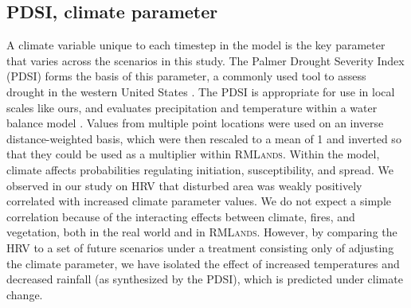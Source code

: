 \documentclass[12pt]{article}
\begin{document}
\begin{spacing}{1}

\subsection*{PDSI, climate parameter}
A climate variable unique to each timestep in the model is the key parameter that varies across the scenarios in this study. The Palmer Drought Severity Index (PDSI) forms the basis of this parameter, a commonly used tool to assess drought in the western United States \citep{Cook2004}. The PDSI is appropriate for use in local scales like ours, and evaluates precipitation and temperature within a water balance model \citep{HeimJr2002}. Values from multiple point locations were used on an inverse distance-weighted basis, which were then rescaled to a mean of 1 and inverted so that they could be used as a multiplier within \textsc{RMLands}. Within the model, climate affects probabilities regulating initiation, susceptibility, and spread. We observed in our study on HRV that disturbed area was weakly positively correlated with increased climate parameter values. We do not expect a simple correlation because of the interacting effects between climate, fires, and vegetation, both in the real world and in \textsc{RMLands}. However, by comparing the HRV to a set of future scenarios under a treatment consisting only of adjusting the climate parameter, we have isolated the effect of increased temperatures and decreased rainfall (as synthesized by the PDSI), which is predicted under climate change.


\end{spacing}
\end{document}
